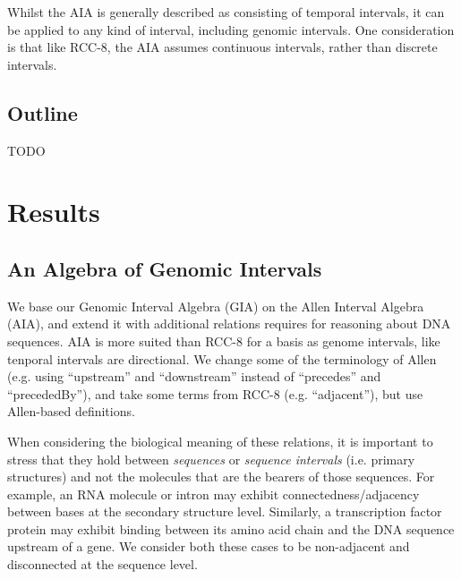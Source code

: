 \documentclass{article}
\begin{document}
Whilst the AIA is generally described as consisting of temporal
intervals, it can be applied to any kind of interval, including
genomic intervals. One consideration is that like RCC-8, the AIA
assumes continuous intervals, rather than discrete intervals.


\subsection{Outline}

TODO

\section{Results}

\subsection{An Algebra of Genomic Intervals}

We base our Genomic Interval Algebra (GIA) on the Allen Interval
Algebra (AIA), and extend it with additional relations requires for
reasoning about DNA sequences. AIA is more suited than RCC-8 for a
basis as genome intervals, like tenporal intervals are directional. We
change some of the terminology of Allen (e.g. using ``upstream'' and
``downstream'' instead of ``precedes'' and ``precededBy''), and take
some terms from RCC-8 (e.g. ``adjacent''), but use Allen-based
definitions.

When considering the biological meaning of these relations, it is
important to stress that they hold between {\em sequences} or
\emph{sequence intervals} (i.e. primary structures) and not the
molecules that are the bearers of those sequences. For example, an RNA
molecule or intron may exhibit connectedness/adjacency between bases
at the secondary structure level. Similarly, a transcription factor
protein may exhibit binding between its amino acid chain and the DNA
sequence upstream of a gene. We consider both these cases to be
non-adjacent and disconnected at the sequence level.
\end{document}
